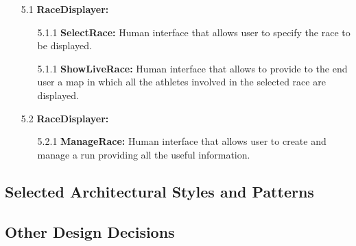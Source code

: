 \begin{enumerate}
\item[5.1] \textbf{RaceDisplayer: }
	\begin{enumerate}
		\item[5.1.1] \textbf{SelectRace:} Human interface that allows user to specify the race to be displayed.
		\item[5.1.1] \textbf{ShowLiveRace:}  Human interface that allows to provide to the end user a map in which all the athletes involved in the selected race are displayed.
	\end{enumerate}	

\item[5.2] \textbf{RaceDisplayer: }
	\begin{enumerate}
		\item[5.2.1] \textbf{ManageRace: } Human interface that allows user to create and manage a run providing all the useful information.
	\end{enumerate}		

\end{enumerate}




\subsection{Selected Architectural Styles and Patterns}
\subsection{Other Design Decisions}